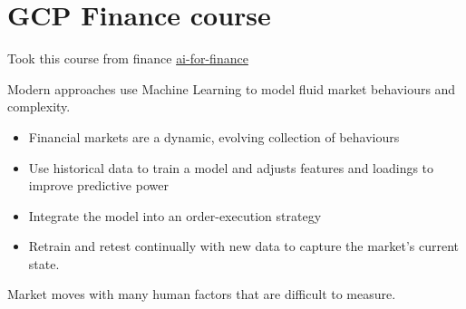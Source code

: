 

\section{GCP Finance course}

Took this course from finance
\href{https://github.com/GoogleCloudPlatform/training-data-analyst/tree/master/courses/ai-for-finance}{ai-for-finance}


Modern approaches use Machine Learning
to model fluid market behaviours and complexity.

\begin{itemize}
\item Financial markets are a dynamic, evolving collection of behaviours
\item Use historical data to train a model and adjusts
features and loadings to improve predictive power
\item Integrate the model into an order-execution strategy
\item Retrain and retest continually with new data
to capture the market's current state.
\end{itemize}


Market moves with many human factors that are difficult to measure.
